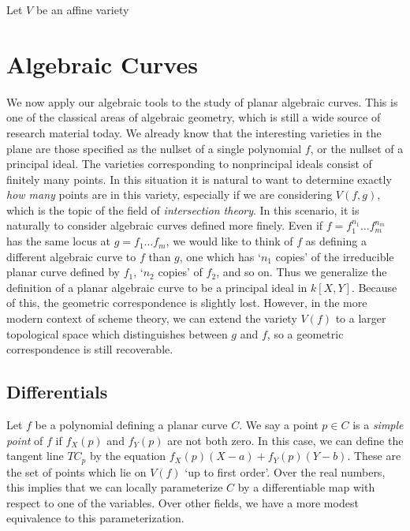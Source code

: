 Let $V$ be an affine variety 










\chapter{Algebraic Curves}

We now apply our algebraic tools to the study of planar algebraic curves. This is one of the classical areas of algebraic geometry, which is still a wide source of research material today. We already know that the interesting varieties in the plane are those specified as the nullset of a single polynomial $f$, or the nullset of a principal ideal. The varieties corresponding to nonprincipal ideals consist of finitely many points. In this situation it is natural to want to determine exactly {\it how many} points are in this variety, especially if we are considering $V(f,g)$, which is the topic of the field of {\it intersection theory}. In this scenario, it is naturally to consider algebraic curves defined more finely. Even if $f = f_1^{n_1} \dots f_m^{n_m}$ has the same locus at $g = f_1 \dots f_m$, we would like to think of $f$ as defining a different algebraic curve to $f$ than $g$, one which has `$n_1$ copies' of the irreducible planar curve defined by $f_1$, `$n_2$ copies' of $f_2$, and so on. Thus we generalize the definition of a planar algebraic curve to be a principal ideal in $k[X,Y]$. Because of this, the geometric correspondence is slightly lost. However, in the more modern context of scheme theory, we can extend the variety $V(f)$ to a larger topological space which distinguishes between $g$ and $f$, so a geometric correspondence is still recoverable.

\section{Differentials}

Let $f$ be a polynomial defining a planar curve $C$. We say a point $p \in C$ is a \emph{simple point} of $f$ if $f_X(p)$ and $f_Y(p)$ are not both zero. In this case, we can define the tangent line $TC_p$ by the equation $f_X(p) (X - a) + f_Y(p) (Y - b)$. These are the set of points which lie on $V(f)$ `up to first order'. Over the real numbers, this implies that we can locally parameterize $C$ by a differentiable map with respect to one of the variables. Over other fields, we have a more modest equivalence to this parameterization.

